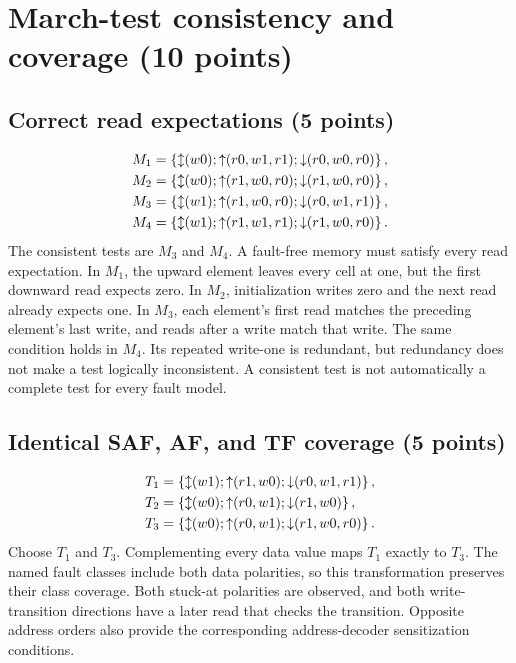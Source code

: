 \section{March-test consistency and coverage (10 points)}
\subsection{Correct read expectations (5 points)}
\begin{align*}
M_1&=\left\{\mathord{\updownarrow}(w0);\mathord{\uparrow}(r0,w1,r1);\mathord{\downarrow}(r0,w0,r0)\right\},\\
M_2&=\left\{\mathord{\updownarrow}(w0);\mathord{\uparrow}(r1,w0,r0);\mathord{\downarrow}(r1,w0,r0)\right\},\\
M_3&=\left\{\mathord{\updownarrow}(w1);\mathord{\uparrow}(r1,w0,r0);\mathord{\downarrow}(r0,w1,r1)\right\},\\
M_4&=\left\{\mathord{\updownarrow}(w1);\mathord{\uparrow}(r1,w1,r1);\mathord{\downarrow}(r1,w0,r0)\right\}.
\end{align*}
\answer The consistent tests are $M_3$ and $M_4$. A fault-free memory must satisfy every read expectation. In $M_1$, the upward element leaves every cell at one, but the first downward read expects zero. In $M_2$, initialization writes zero and the next read already expects one. In $M_3$, each element's first read matches the preceding element's last write, and reads after a write match that write. The same condition holds in $M_4$. Its repeated write-one is redundant, but redundancy does not make a test logically inconsistent. A consistent test is not automatically a complete test for every fault model.

\subsection{Identical SAF, AF, and TF coverage (5 points)}
\begin{align*}
T_1&=\left\{\mathord{\updownarrow}(w1);\mathord{\uparrow}(r1,w0);\mathord{\downarrow}(r0,w1,r1)\right\},\\
T_2&=\left\{\mathord{\updownarrow}(w0);\mathord{\uparrow}(r0,w1);\mathord{\downarrow}(r1,w0)\right\},\\
T_3&=\left\{\mathord{\updownarrow}(w0);\mathord{\uparrow}(r0,w1);\mathord{\downarrow}(r1,w0,r0)\right\}.
\end{align*}
\answer Choose $T_1$ and $T_3$. Complementing every data value maps $T_1$ exactly to $T_3$. The named fault classes include both data polarities, so this transformation preserves their class coverage. Both stuck-at polarities are observed, and both write-transition directions have a later read that checks the transition. Opposite address orders also provide the corresponding address-decoder sensitization conditions.

